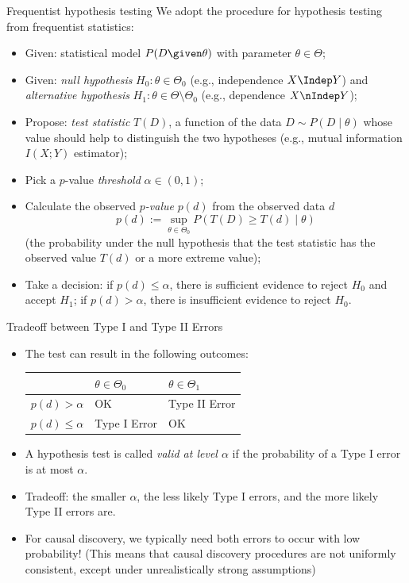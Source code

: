 \begin{frame}{Frequentist hypothesis testing}
  We adopt the procedure for hypothesis testing from frequentist statistics:   
  \begin{itemize}
    \item Given: statistical model $P(D\given \theta)$ with parameter $\theta \in \Theta$;
    \item Given: \emph{null hypothesis} $H_0 : \theta \in \Theta_0$
      (e.g., independence $X \Indep Y$) and \emph{alternative hypothesis} $H_1 : \theta \in \Theta\setminus\Theta_0$ 
      (e.g., dependence $X \nIndep Y$);
    \item Propose: \emph{test statistic} $T(D)$, a function of the data $D \sim P(D \mid \theta)$
      whose value should help to distinguish the two hypotheses (e.g., mutual information $I(X;Y)$ estimator);
    \item Pick a $p$-value \emph{threshold} $\alpha \in (0,1)$;
    \item Calculate the observed \emph{$p$-value} $p(d)$ from the observed data $d$
$$p(d) := \sup_{\theta\in\Theta_0} P(T(D) \ge T(d) \mid \theta)$$
      (the probability under the null hypothesis that the test statistic has the observed value $T(d)$ or a more extreme value);
    \item Take a decision:
      if $p(d) \le \alpha$, there is sufficient evidence to reject $H_0$ and accept $H_1$;
      if $p(d) > \alpha$, there is insufficient evidence to reject $H_0$.
  \end{itemize}
\end{frame}

\begin{frame}{Tradeoff between Type I and Type II Errors}
  \begin{itemize}
    \item The test can result in the following outcomes:

      \medskip
  \begin{center}\begin{tabular}{l|ll}
                      & $\theta \in \Theta_0$ & $\theta \in \Theta_1$ \\
    \hline
    $p(d) > \alpha$   & OK    & Type II Error \\
    $p(d) \le \alpha$ & Type I Error & OK 
  \end{tabular}\end{center}
      \medskip

    \item A hypothesis test is called \emph{valid at level $\alpha$} if the probability of a Type I error is at most $\alpha$.
    \item Tradeoff: the smaller $\alpha$, the less likely Type I errors, and the more likely Type II errors are.
    \item For causal discovery, we typically need both errors to occur with low probability!
      (This means that causal discovery procedures are not uniformly consistent, except under unrealistically strong assumptions)
  \end{itemize}
\end{frame}

